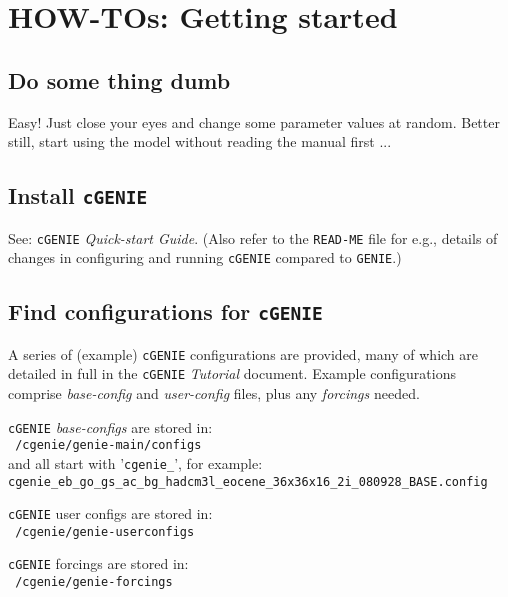 \documentclass[10pt,twoside]{article}
\begin{document}
\newpage
\section{HOW-TOs: Getting started}\label{how-to-0}



\subsection{Do some thing dumb}\label{Do some thing dumb}

Easy! Just close your eyes and change some parameter values at random. Better still, start using the model without reading the manual first ...



\subsection{Install \texttt{cGENIE}}\label{Install cGENIE}

See: \texttt{cGENIE} \textit{Quick-start Guide}. (Also refer to the \texttt{READ-ME} file for e.g., details of changes in configuring and running \texttt{cGENIE} compared to \texttt{GENIE}.)



\subsection{Find configurations for \texttt{cGENIE}}\label{Find configurations for cGENIE}

A series of (example) \texttt{cGENIE} configurations are provided, many of which are detailed in full in the \texttt{cGENIE} \textit{Tutorial} document.
Example configurations comprise \textit{base-config} and \textit{user-config} files, plus any \textit{forcings} needed.
\begin{compactitem}
	\item
  \texttt{cGENIE} \textit{base-configs} are stored in:
	\\ \texttt{~/cgenie/genie-main/configs}
	\\and all start with '\texttt{cgenie\_}', for example: \\ \texttt{cgenie\_eb\_go\_gs\_ac\_bg\_hadcm3l\_eocene\_36x36x16\_2i\_080928\_BASE.config}
	\item
	\texttt{cGENIE} user configs are stored in:
	\\ \texttt{~/cgenie/genie-userconfigs}
	\item
	\texttt{cGENIE} forcings are stored in:
	\\ \texttt{~/cgenie/genie-forcings}
\end{compactitem}
\end{document}
